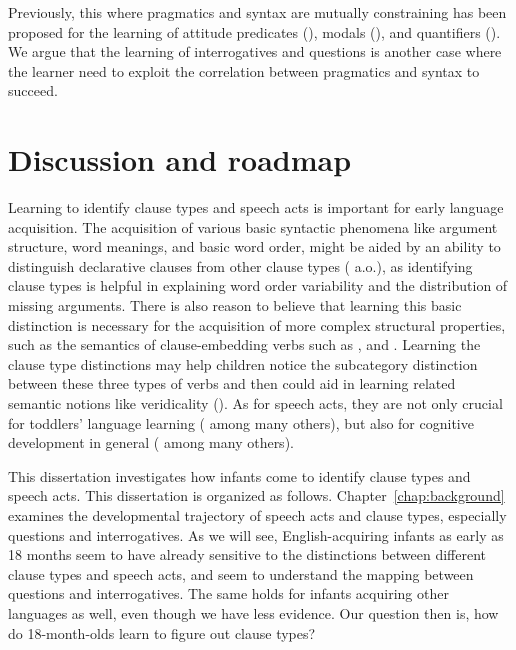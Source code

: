 Previously, this \hypos{} where pragmatics and syntax are mutually constraining has been proposed for the learning of attitude predicates (\citealt{lewis2017think, dudleyetal2018, hacquardlidz2018}), modals (\citealt{dieuleveut2021}), and quantifiers (\citealt{knowlton2021}). We argue that the learning of interrogatives and questions is another case where the learner need to exploit the correlation between pragmatics and syntax to succeed.  



\section{Discussion and roadmap}
\label{sec:intro:roadmap}

Learning to identify clause types and speech acts is important for early language acquisition. The acquisition of various basic syntactic phenomena like argument structure, word meanings, and basic word order, might be aided by an ability to distinguish declarative clauses from other clause types (\citealt{pinker1984, pinker1989, gleitman1990, frankgoldwaterfrank2013, perkins2019} a.o.), as identifying clause types is helpful in explaining word order variability and the distribution of missing arguments. There is also reason to believe that learning this basic distinction is necessary for the acquisition of more complex structural properties, such as the semantics of clause-embedding verbs such as ,  and . Learning the clause type distinctions may help children notice the subcategory distinction between these three types of verbs and then could aid in learning related semantic notions like veridicality (\citealt{white2015diss, lewis2017think,dudley2017,hacquardlidz2018}). As for speech acts, they are not only crucial for toddlers' language learning (\citealt{ninio1980, hoff1985cds,yoder1994,rowland2003cdswh, valian2003cds, rowe2017wh, gaudreau2021question} among many others), but also for cognitive development in general (\citealt{hohmann1995educating} among many others). 

This dissertation investigates how infants come to identify clause types and speech acts. This dissertation is organized as follows. Chapter~\ref{chap:background} examines the developmental trajectory of speech acts and clause types, especially questions and interrogatives. As we will see, English-acquiring infants as early as 18 months seem to have already sensitive to the distinctions between different clause types and speech acts, and seem to understand the mapping between questions and interrogatives. The same holds for infants acquiring other languages as well, even though we have less evidence. Our question then is, how do 18-month-olds learn to figure out clause types?

